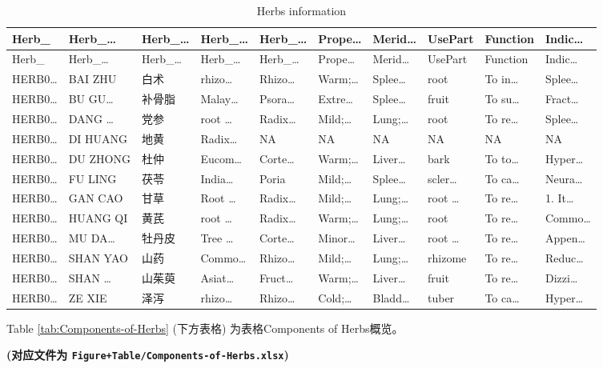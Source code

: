 \documentclass[
]{article}
\begin{document}
\begin{longtable}[]{@{}llllllllll@{}}
\caption{\label{tab:Herbs-information}Herbs information}\tabularnewline
\toprule
Herb\_ & Herb\_\ldots{} & Herb\_\ldots{} & Herb\_\ldots{} & Herb\_\ldots{} & Prope\ldots{} & Merid\ldots{} & UsePart & Function & Indic\ldots{}\tabularnewline
\midrule
\endfirsthead
\toprule
Herb\_ & Herb\_\ldots{} & Herb\_\ldots{} & Herb\_\ldots{} & Herb\_\ldots{} & Prope\ldots{} & Merid\ldots{} & UsePart & Function & Indic\ldots{}\tabularnewline
\midrule
\endhead
HERB0\ldots{} & BAI ZHU & 白术 & rhizo\ldots{} & Rhizo\ldots{} & Warm;\ldots{} & Splee\ldots{} & root & To in\ldots{} & Splee\ldots{}\tabularnewline
HERB0\ldots{} & BU GU\ldots{} & 补骨脂 & Malay\ldots{} & Psora\ldots{} & Extre\ldots{} & Splee\ldots{} & fruit & To su\ldots{} & Fract\ldots{}\tabularnewline
HERB0\ldots{} & DANG \ldots{} & 党参 & root \ldots{} & Radix\ldots{} & Mild;\ldots{} & Lung;\ldots{} & root & To re\ldots{} & Splee\ldots{}\tabularnewline
HERB0\ldots{} & DI HUANG & 地黄 & Radix\ldots{} & NA & NA & NA & NA & NA & NA\tabularnewline
HERB0\ldots{} & DU ZHONG & 杜仲 & Eucom\ldots{} & Corte\ldots{} & Warm;\ldots{} & Liver\ldots{} & bark & To to\ldots{} & Hyper\ldots{}\tabularnewline
HERB0\ldots{} & FU LING & 茯苓 & India\ldots{} & Poria & Mild;\ldots{} & Splee\ldots{} & scler\ldots{} & To ca\ldots{} & Neura\ldots{}\tabularnewline
HERB0\ldots{} & GAN CAO & 甘草 & Root \ldots{} & Radix\ldots{} & Mild;\ldots{} & Lung;\ldots{} & root \ldots{} & To re\ldots{} & 1. It\ldots{}\tabularnewline
HERB0\ldots{} & HUANG QI & 黄芪 & root \ldots{} & Radix\ldots{} & Warm;\ldots{} & Lung;\ldots{} & root & To re\ldots{} & Commo\ldots{}\tabularnewline
HERB0\ldots{} & MU DA\ldots{} & 牡丹皮 & Tree \ldots{} & Corte\ldots{} & Minor\ldots{} & Liver\ldots{} & root \ldots{} & To re\ldots{} & Appen\ldots{}\tabularnewline
HERB0\ldots{} & SHAN YAO & 山药 & Commo\ldots{} & Rhizo\ldots{} & Mild;\ldots{} & Lung;\ldots{} & rhizome & To re\ldots{} & Reduc\ldots{}\tabularnewline
HERB0\ldots{} & SHAN \ldots{} & 山茱萸 & Asiat\ldots{} & Fruct\ldots{} & Warm;\ldots{} & Liver\ldots{} & fruit & To re\ldots{} & Dizzi\ldots{}\tabularnewline
HERB0\ldots{} & ZE XIE & 泽泻 & rhizo\ldots{} & Rhizo\ldots{} & Cold;\ldots{} & Bladd\ldots{} & tuber & To ca\ldots{} & Hyper\ldots{}\tabularnewline
\bottomrule
\end{longtable}

Table \ref{tab:Components-of-Herbs} (下方表格) 为表格Components of Herbs概览。

\textbf{(对应文件为 \texttt{Figure+Table/Components-of-Herbs.xlsx})}
\end{document}
